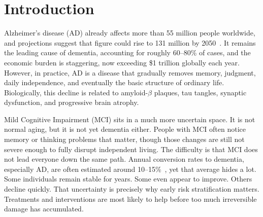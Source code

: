 \documentclass[blue]{ludusofficial}  %
\begin{document}

\maketitle

\section{Introduction}

Alzheimer's disease (AD) already affects more than 55 million people worldwide, and projections suggest that figure could rise to 131 million by 2050~\cite{hafeez2024deep}. It remains the leading cause of dementia, accounting for roughly 60--80\% of cases, and the economic burden is staggering, now exceeding \$1 trillion globally each year. However, in practice, AD is a disease that gradually removes memory, judgment, daily independence, and eventually the basic structure of ordinary life. Biologically, this decline is related to amyloid-$\beta$ plaques, tau tangles, synaptic dysfunction, and progressive brain atrophy.

Mild Cognitive Impairment (MCI) sits in a much more uncertain space. It is not normal aging, but it is not yet dementia either. People with MCI often notice memory or thinking problems that matter, though those changes are still not severe enough to fully disrupt independent living. The difficulty is that MCI does not lead everyone down the same path. Annual conversion rates to dementia, especially AD, are often estimated around 10--15\%~\cite{li2021predicting}, yet that average hides a lot. Some individuals remain stable for years. Some even appear to improve. Others decline quickly. That uncertainty is precisely why early risk stratification matters. Treatments and interventions are most likely to help before too much irreversible damage has accumulated.
\end{document}
